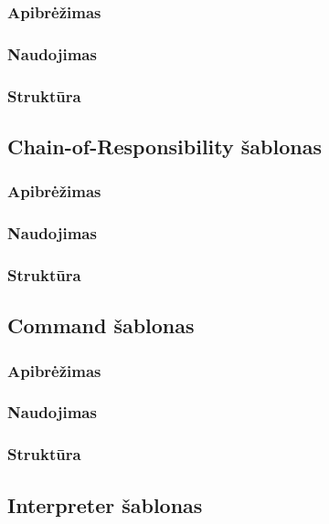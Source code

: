 \documentclass[10pt]{IEEEtran}
\begin{document}
			\subsubsection{Apibrėžimas}

			\subsubsection{Naudojimas}

			\subsubsection{Struktūra}

		\subsection{Chain-of-Responsibility šablonas}

			\subsubsection{Apibrėžimas}

			\subsubsection{Naudojimas}

			\subsubsection{Struktūra}

		\subsection{Command šablonas}

			\subsubsection{Apibrėžimas}

			\subsubsection{Naudojimas}

			\subsubsection{Struktūra}

		\subsection{Interpreter šablonas}
\end{document}
